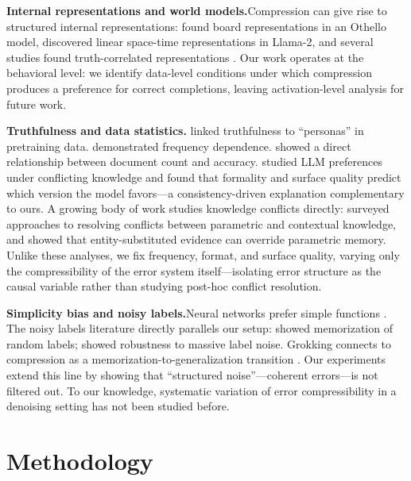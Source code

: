 \documentclass{article}
\begin{document}
\textbf{Internal representations and world models.}\quad Compression can give rise to structured internal representations: \citet{li2023a_emergent} found board representations in an Othello model, \citet{gurnee2024language} discovered linear space-time representations in Llama-2, and several studies found truth-correlated representations \citep{marks2024geometry,burns2023discovering,li2023b_inference,azaria2023internal,ravfogel2025emergence}. Our work operates at the behavioral level: we identify data-level conditions under which compression produces a preference for correct completions, leaving activation-level analysis for future work.

\textbf{Truthfulness and data statistics.}\quad \citet{joshi2024personas} linked truthfulness to ``personas'' in pretraining data. \citet{elazar2022measuring} demonstrated frequency dependence. \citet{kandpal2023large} showed a direct relationship between document count and accuracy. \citet{li2024formality} studied LLM preferences under conflicting knowledge and found that formality and surface quality predict which version the model favors---a consistency-driven explanation complementary to ours. A growing body of work studies knowledge conflicts directly: \citet{xie2024adaptive} surveyed approaches to resolving conflicts between parametric and contextual knowledge, and \citet{longpre2021entity} showed that entity-substituted evidence can override parametric memory. Unlike these analyses, we fix frequency, format, and surface quality, varying only the compressibility of the error system itself---isolating error structure as the causal variable rather than studying post-hoc conflict resolution.

\textbf{Simplicity bias and noisy labels.}\quad Neural networks prefer simple functions \citep{valle2019deep,mingard2021sgd,goldblum2024no}. The noisy labels literature directly parallels our setup: \citet{zhang2017understanding} showed memorization of random labels; \citet{rolnick2017deep} showed robustness to massive label noise. Grokking connects to compression as a memorization-to-generalization transition \citep{nanda2023progress,liu2023grokking}. Our experiments extend this line by showing that ``structured noise''---coherent errors---is not filtered out. To our knowledge, systematic variation of error compressibility in a denoising setting has not been studied before.

\section{Methodology}
\label{sec:methodology}
\end{document}
